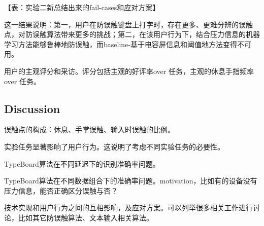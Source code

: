 【表：实验二新总结出来的fail-cases和应对方案】

这一结果说明：第一，用户在防误触键盘上打字时，存在更多、更难分辨的误触点，对防误触算法带来更多的挑战；第二，在该用户行为下，结合压力信息的机器学习方法能够鲁棒地防误触，而baseline-基于电容屏信息和阈值地方法变得不可用。

用户的主观评分和采访。评分包括主观的好评率over 任务，主观的休息手指频率over 任务。

\subsection{Discussion}

误触点的构成：休息、手掌误触、输入时误触的比例。

实验任务显著影响了用户行为。这说明了考虑不同实验任务的必要性。

TypeBoard算法在不同延迟下的识别准确率问题。

TypeBoard算法在不同数据组合下的准确率问题。motivation，比如有的设备没有压力信息，能否正确区分误触与否？

技术实现和用户行为之间的互相影响，及应对方案。可以列举很多相关工作进行讨论，比如其它防误触算法、文本输入相关算法。
